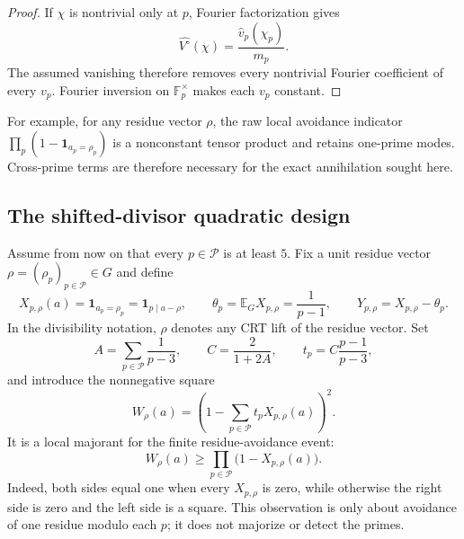 \begin{proof}
If $\chi$ is nontrivial only at $p$, Fourier factorization gives
\begin{equation}
 \widehat{V^\circ}(\chi)
 =\frac{\widehat v_p(\chi_p)}{m_p}.
 \label{eq:wt-product-one-prime-coefficient}
\end{equation}
The assumed vanishing therefore removes every nontrivial Fourier
coefficient of every $v_p$.  Fourier inversion on
$\mathbb F_p^\times$ makes each $v_p$ constant.
\end{proof}

For example, for any residue vector $\rho$, the raw local avoidance indicator
$\prod_p(1-\mathbf1_{a_p=\rho_p})$ is a nonconstant tensor product and retains
one-prime modes.  Cross-prime terms are therefore necessary for the exact
annihilation sought here.

\subsection{The shifted-divisor quadratic design}
\label{subsec:shifted-quadratic-design}

Assume from now on that every $p\in\mathcal P$ is at least $5$.  Fix a unit
residue vector $\rho=(\rho_p)_{p\in\mathcal P}\in G$ and define
\begin{equation}
 X_{p,\rho}(a)=\mathbf1_{a_p=\rho_p}
            =\mathbf1_{p\mid a-\rho},
 \qquad
 \theta_p=\mathbb E_G X_{p,\rho}=\frac1{p-1},
 \qquad
 Y_{p,\rho}=X_{p,\rho}-\theta_p.
 \label{eq:wt-X-theta-Y}
\end{equation}
In the divisibility notation, $\rho$ denotes any CRT lift of the residue
vector.  Set
\begin{equation}
 A=\sum_{p\in\mathcal P}\frac1{p-3},
 \qquad
 C=\frac2{1+2A},
 \qquad
 t_p=C\frac{p-1}{p-3},
 \label{eq:wt-designed-coefficients}
\end{equation}
and introduce the nonnegative square
\begin{equation}
 W_\rho(a)=\left(1-\sum_{p\in\mathcal P}t_pX_{p,\rho}(a)\right)^2.
 \label{eq:wt-shifted-square}
\end{equation}
It is a local majorant for the finite residue-avoidance event:
\begin{equation}
 W_\rho(a)\ge
 \prod_{p\in\mathcal P}\bigl(1-X_{p,\rho}(a)\bigr).
 \label{eq:wt-local-majorant}
\end{equation}
Indeed, both sides equal one when every $X_{p,\rho}$ is zero, while otherwise
the right side is zero and the left side is a square.  This observation is
only about avoidance of one residue modulo each $p$; it does not majorize or
detect the primes.

